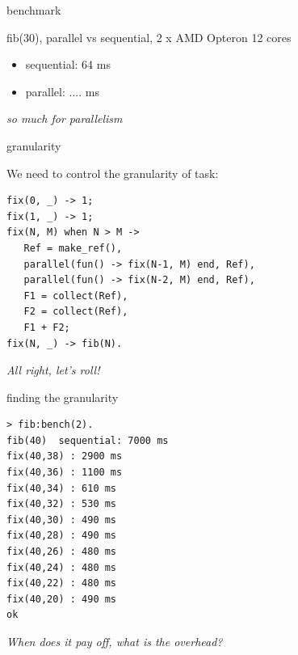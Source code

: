 \begin{frame}{benchmark}

fib(30),  parallel vs sequential, 2 x AMD Opteron 12 cores

\pause\vspace{20pt}

\begin{itemize}
\pause \item sequential: 64 ms
\pause \item parallel: \pause ....  ms
\end{itemize}

\vspace{20pt}
{\em so much for parallelism}

\end{frame} 

\begin{frame}[fragile]{granularity}

We need to control the granularity of task:

 \begin{verbatim}
fix(0, _) -> 1;
fix(1, _) -> 1;
fix(N, M) when N > M -> 
   Ref = make_ref(),
   parallel(fun() -> fix(N-1, M) end, Ref),
   parallel(fun() -> fix(N-2, M) end, Ref),
   F1 = collect(Ref),
   F2 = collect(Ref),
   F1 + F2;
fix(N, _) -> fib(N).
\end{verbatim}

\pause\vspace{20pt}
{\em All right, let's roll!}
\end{frame}

\begin{frame}[fragile]{finding the granularity}

\begin{verbatim}
> fib:bench(2).
fib(40)  sequential: 7000 ms
fix(40,38) : 2900 ms
fix(40,36) : 1100 ms
fix(40,34) : 610 ms
fix(40,32) : 530 ms
fix(40,30) : 490 ms
fix(40,28) : 490 ms
fix(40,26) : 480 ms
fix(40,24) : 480 ms
fix(40,22) : 480 ms
fix(40,20) : 490 ms
ok
\end{verbatim}

{\em When does it pay off, what is the overhead?}

\end{frame}


